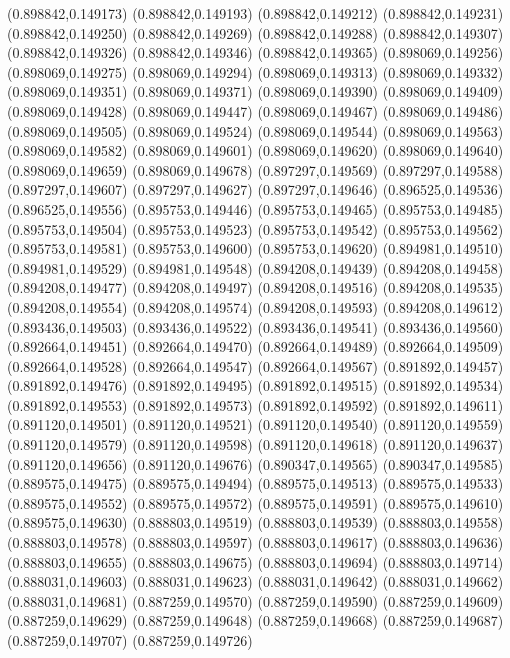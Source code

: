 (0.898842,0.149173)
(0.898842,0.149193)
(0.898842,0.149212)
(0.898842,0.149231)
(0.898842,0.149250)
(0.898842,0.149269)
(0.898842,0.149288)
(0.898842,0.149307)
(0.898842,0.149326)
(0.898842,0.149346)
(0.898842,0.149365)
(0.898069,0.149256)
(0.898069,0.149275)
(0.898069,0.149294)
(0.898069,0.149313)
(0.898069,0.149332)
(0.898069,0.149351)
(0.898069,0.149371)
(0.898069,0.149390)
(0.898069,0.149409)
(0.898069,0.149428)
(0.898069,0.149447)
(0.898069,0.149467)
(0.898069,0.149486)
(0.898069,0.149505)
(0.898069,0.149524)
(0.898069,0.149544)
(0.898069,0.149563)
(0.898069,0.149582)
(0.898069,0.149601)
(0.898069,0.149620)
(0.898069,0.149640)
(0.898069,0.149659)
(0.898069,0.149678)
(0.897297,0.149569)
(0.897297,0.149588)
(0.897297,0.149607)
(0.897297,0.149627)
(0.897297,0.149646)
(0.896525,0.149536)
(0.896525,0.149556)
(0.895753,0.149446)
(0.895753,0.149465)
(0.895753,0.149485)
(0.895753,0.149504)
(0.895753,0.149523)
(0.895753,0.149542)
(0.895753,0.149562)
(0.895753,0.149581)
(0.895753,0.149600)
(0.895753,0.149620)
(0.894981,0.149510)
(0.894981,0.149529)
(0.894981,0.149548)
(0.894208,0.149439)
(0.894208,0.149458)
(0.894208,0.149477)
(0.894208,0.149497)
(0.894208,0.149516)
(0.894208,0.149535)
(0.894208,0.149554)
(0.894208,0.149574)
(0.894208,0.149593)
(0.894208,0.149612)
(0.893436,0.149503)
(0.893436,0.149522)
(0.893436,0.149541)
(0.893436,0.149560)
(0.892664,0.149451)
(0.892664,0.149470)
(0.892664,0.149489)
(0.892664,0.149509)
(0.892664,0.149528)
(0.892664,0.149547)
(0.892664,0.149567)
(0.891892,0.149457)
(0.891892,0.149476)
(0.891892,0.149495)
(0.891892,0.149515)
(0.891892,0.149534)
(0.891892,0.149553)
(0.891892,0.149573)
(0.891892,0.149592)
(0.891892,0.149611)
(0.891120,0.149501)
(0.891120,0.149521)
(0.891120,0.149540)
(0.891120,0.149559)
(0.891120,0.149579)
(0.891120,0.149598)
(0.891120,0.149618)
(0.891120,0.149637)
(0.891120,0.149656)
(0.891120,0.149676)
(0.890347,0.149565)
(0.890347,0.149585)
(0.889575,0.149475)
(0.889575,0.149494)
(0.889575,0.149513)
(0.889575,0.149533)
(0.889575,0.149552)
(0.889575,0.149572)
(0.889575,0.149591)
(0.889575,0.149610)
(0.889575,0.149630)
(0.888803,0.149519)
(0.888803,0.149539)
(0.888803,0.149558)
(0.888803,0.149578)
(0.888803,0.149597)
(0.888803,0.149617)
(0.888803,0.149636)
(0.888803,0.149655)
(0.888803,0.149675)
(0.888803,0.149694)
(0.888803,0.149714)
(0.888031,0.149603)
(0.888031,0.149623)
(0.888031,0.149642)
(0.888031,0.149662)
(0.888031,0.149681)
(0.887259,0.149570)
(0.887259,0.149590)
(0.887259,0.149609)
(0.887259,0.149629)
(0.887259,0.149648)
(0.887259,0.149668)
(0.887259,0.149687)
(0.887259,0.149707)
(0.887259,0.149726)
